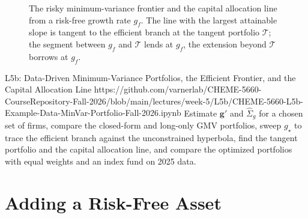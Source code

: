 \documentclass[11pt]{article}
\begin{document}
\begin{figure}[ht]
  \centering
  \caption{The risky minimum-variance frontier and the capital allocation line from a risk-free growth rate $g_f$. The line with the largest attainable slope is tangent to the efficient branch at the tangent portfolio $\mathcal T$; the segment between $g_f$ and $\mathcal T$ lends at $g_f$, the extension beyond $\mathcal T$ borrows at $g_f$.}
  \label{fig:frontier-cal}
\end{figure}

\notebooklink
  {L5b: Data-Driven Minimum-Variance Portfolios, the Efficient Frontier, and the Capital Allocation Line}
  {https://github.com/varnerlab/CHEME-5660-CourseRepository-Fall-2026/blob/main/lectures/week-5/L5b/CHEME-5660-L5b-Example-Data-MinVar-Portfolio-Fall-2026.ipynb}
  {Estimate $\mathbf g'$ and $\widehat\Sigma_g$ for a chosen set of firms, compare the closed-form and long-only GMV portfolios, sweep $g_\star$ to trace the efficient branch against the unconstrained hyperbola, find the tangent portfolio and the capital allocation line, and compare the optimized portfolios with equal weights and an index fund on 2025 data.}

\section{Adding a Risk-Free Asset}
\end{document}
